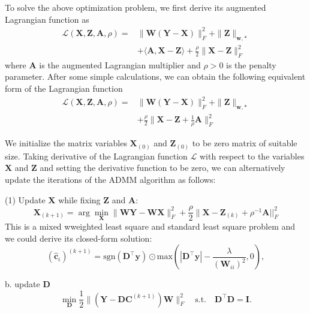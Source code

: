 \documentclass[10pt,twocolumn,letterpaper]{article}
\begin{document}
To solve the above optimization problem, we first derive its augmented Lagrangian function as 
\begin{equation}
\begin{split}
\mathcal{L}(\mathbf{X},\mathbf{Z},\mathbf{A},\rho)
=
&\|\mathbf{W}(\mathbf{Y}-\mathbf{X})\|_{F}^{2}
+
\|\mathbf{Z}\|_{\bm{w},*}
\\
&
+
\langle
\mathbf{A},\mathbf{X}-\mathbf{Z}
\rangle
+
\frac{\rho}{2}
\|\mathbf{X}-\mathbf{Z}\|_{F}^{2}
\end{split}
\end{equation}
where $\mathbf{A}$ is the augmented Lagrangian multiplier and $\rho>0$ is the penalty parameter. 
After some simple calculations, we can obtain the following equivalent form of the Lagrangian function
\begin{equation}
\begin{split}
\mathcal{L}(\mathbf{X},\mathbf{Z},\mathbf{A},\rho)
=
&
\|\mathbf{W}(\mathbf{Y}-\mathbf{X})\|_{F}^{2}
+
\|\mathbf{Z}\|_{\bm{w},*}
\\
&
+
\frac{\rho}{2}
\|\mathbf{X}-\mathbf{Z}+\frac{1}{\rho}\mathbf{A}\|_{F}^{2}
\end{split}
\end{equation}

We initialize the matrix variables $\mathbf{X}_{(0)}$ and $\mathbf{Z}_{(0)}$ to be zero matrix of suitable size.
Taking derivative of the Lagrangian function $\mathcal{L}$ with respect to the variables $\mathbf{X}$ and $\mathbf{Z}$ and setting the derivative function to be zero, we can alternatively update the iterations of the ADMM algorithm as follows:

(1) Update $\mathbf{X}$ while fixing $\mathbf{Z}$ and $\mathbf{A}$:
\begin{equation}
\mathbf{X}_{(k+1)}
=
\arg\min_{\mathbf{X}}
\|\mathbf{W}\mathbf{Y} - \mathbf{W}\mathbf{X}\|_{F}^{2} 
+
\frac{\rho}{2}\|\mathbf{X} - \mathbf{Z}_{(k)} + \rho^{-1}\mathbf{A}||_{F}^{2}
\end{equation}
This is a mixed wweighted least square and standard least square problem and we could derive its closed-form solution:
\begin{equation}
(\hat{\mathbf{c}}_{i})^{(k+1)}
=
\text{sgn}(\mathbf{D^{\top}y}) 
\odot 
\text{max}(|\mathbf{D^{\top}y}|-\frac{\lambda}{(\mathbf{W}_{ii})^{2}},0),
\end{equation}

b. update $\mathbf{D}$
\begin{equation}
\min_{\mathbf{D}}\frac{1}{2}\|(\mathbf{Y}-\mathbf{D}\mathbf{C}^{(k+1)})\mathbf{W}\|_{F}^{2}
\quad
\text{s.t.}
\quad
\mathbf{D}^{\top}\mathbf{D} =\mathbf{I}. 
\end{equation}
\end{document}
